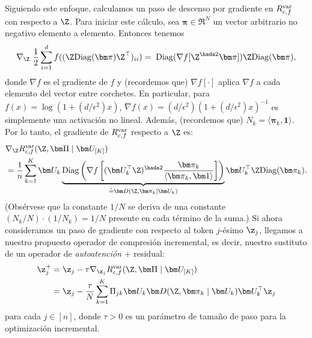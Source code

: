 \documentclass[../../book-main.tex]{subfiles}
\begin{document}
Siguiendo este enfoque, calculamos un paso de descenso por gradiente en
$R_{c,f}^{\rm var}$ con respecto a $\Z$.
Para iniciar este cálculo, sea $\bm \pi \in \Re^N$ un
vector arbitrario no negativo elemento a elemento. Entonces tenemos
\begin{equation}\label{eq1:grad Rcf}
    \nabla_{\Z} \ \frac{1}{2} \sum_{i = 1}^{d} f(  (\Z
    \mathrm{Diag}(\bm \pi) \Z^{\top} )_{ii}) %
    = \; \mathrm{Diag}(\nabla f[ \Z^{\hada 2} \bm \pi] ) \Z
    \mathrm{Diag}(\bm \pi),
\end{equation}
donde $\nabla f$ es el gradiente de $f$ y (recordemos que) $\nabla
f[\cdot]$ aplica $\nabla f$ a cada elemento del vector entre
corchetes. En particular, para $ f(x) = \log(1 + (d/\epsilon^{2}) x)$,
$\nabla f(x) = (d / \epsilon^{2}) (1+ (d / \epsilon^{2}) x)^{-1}$ es
simplemente una activación no lineal. Además, (recordemos que) $N_{k} = \langle \bm
\pi_{k}, \bm 1\rangle$. Por lo tanto, el gradiente de $R^{\rm var}_{c,f}$
respecto a $\Z$ es:
\begin{align}\label{eq2:grad Rcf}
    &\nabla_{\Z} R^{\rm var}_{c,f}(\Z,\bm \Pi \mid \bm
    U_{[K]}) \\
    &=
    \frac{1}{n}
    \sum_{k=1}^K \bm U_{k} \underbrace{\mathrm{Diag} \left(
            \nabla f\left[ (\bm
                U_{k}^{\top} \Z)^{\hada 2}  \frac{\bm \pi_k}{\langle
                    \bm \pi_{k},
    \bm 1\rangle} \right] \right)}_{\doteq \bm D(\Z, \bm \pi_{k} \mid
    \bm U_{k})} \bm U_{k}^{\top} \Z \mathrm{Diag}(\bm \pi_k).
\end{align}
(Obsérvese que la constante $1/N$ se deriva de una constante $(N_{k}/N)\cdot (1/N_{k})
= 1/N$ presente en cada término de la suma.) Si ahora consideramos un
paso de gradiente con respecto al token $j$-ésimo $\z_j$, 
llegamos a nuestro propuesto operador de compresión incremental, es decir,
nuestro sustituto de un operador de \textit{autoatención} + residual:
\begin{align}\label{eq:layer-operation-orig}
    \z_j^+
    &= \z_{j} - \tau \nabla_{\z_{j}}R_{c, f}^{\rm var}(\Z, \bm
    \Pi \mid \bm U_{[K]}) \\
    &= \z_j - \frac{\tau}{N} \sum_{k=1}^K
    \Pi_{jk} \bm U_{k} \bm D(\Z, \bm \pi_{k} \mid \bm U_{k}) \bm
    U_{k}^{\top} \z_j
\end{align}
para cada \(j \in [n]\), donde $\tau > 0$ es un parámetro de tamaño de paso para
la optimización incremental.
\end{document}
